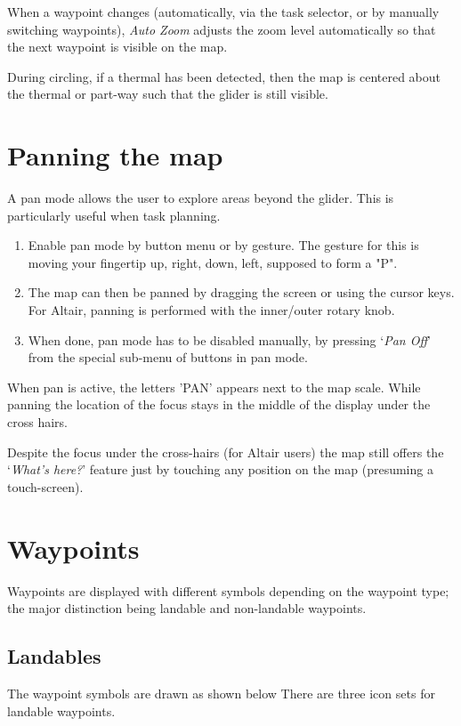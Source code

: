When a waypoint changes (automatically, via the task selector, or by
manually switching waypoints), \emph{Auto Zoom} adjusts the zoom level
automatically so that the next waypoint is visible on the map.

During circling, if a thermal has been detected, then the map is centered about
the thermal or part-way such that the glider is still visible.

\section{Panning the map}\label{sec:panning}

A pan mode allows the user to explore areas beyond the glider.  This
is particularly useful when task planning.
\begin{enumerate}
\item Enable pan mode by button menu or by gesture.  The gesture for this is moving your fingertip up, right, down, left, supposed to form a "P".
\item The map can then be panned by dragging the screen or using the cursor
  keys.  For Altair, panning is performed with the inner/outer rotary knob.
\item When done, pan mode has to be disabled manually, by pressing `{\it Pan Off}' 
  from the special sub-menu of buttons in pan mode.
\end{enumerate} 

When pan is active, the letters 'PAN' appears next to the map scale.  While
panning the location of the focus stays in the middle of the display under the
cross hairs. 

Despite the focus under the cross-hairs (for Altair users) the map 
still offers the `{\it What's here?}' feature just by touching any 
position on the map (presuming a touch-screen).


\section{Waypoints} \label{sec:waypoint-schemes}
Waypoints are displayed with different symbols depending on the
waypoint type; the major distinction being landable and non-landable
waypoints.

\subsection*{Landables}
The waypoint symbols are drawn as shown below There are three icon sets for
landable waypoints. 

